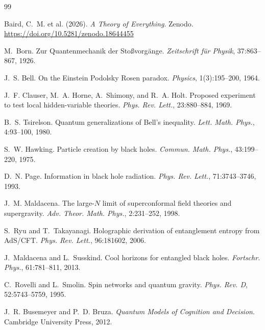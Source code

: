\documentclass[11pt]{article}
\begin{document}
\begin{thebibliography}{99}

Baird, C.~M. et al. (2026).
\newblock \emph{A Theory of Everything}.
\newblock Zenodo. \url{https://doi.org/10.5281/zenodo.18644455}

M.~Born.
\newblock Zur {Q}uantenmechanik der {S}to{\ss}vorg{\"a}nge.
\newblock \emph{Zeitschrift f{\"u}r Physik}, 37:863--867, 1926.

J.~S. Bell.
\newblock On the {E}instein {P}odolsky {R}osen paradox.
\newblock \emph{Physics}, 1(3):195--200, 1964.

J.~F. Clauser, M.~A. Horne, A.~Shimony, and R.~A. Holt.
\newblock Proposed experiment to test local hidden-variable theories.
\newblock \emph{Phys. Rev. Lett.}, 23:880--884, 1969.

B.~S. Tsirelson.
\newblock Quantum generalizations of {B}ell's inequality.
\newblock \emph{Lett. Math. Phys.}, 4:93--100, 1980.

S.~W. Hawking.
\newblock Particle creation by black holes.
\newblock \emph{Commun. Math. Phys.}, 43:199--220, 1975.

D.~N. Page.
\newblock Information in black hole radiation.
\newblock \emph{Phys. Rev. Lett.}, 71:3743--3746, 1993.

J.~M. Maldacena.
\newblock The large-$N$ limit of superconformal field theories and supergravity.
\newblock \emph{Adv. Theor. Math. Phys.}, 2:231--252, 1998.

S.~Ryu and T.~Takayanagi.
\newblock Holographic derivation of entanglement entropy from {A}d{S}/{CFT}.
\newblock \emph{Phys. Rev. Lett.}, 96:181602, 2006.

J.~Maldacena and L.~Susskind.
\newblock Cool horizons for entangled black holes.
\newblock \emph{Fortschr. Phys.}, 61:781--811, 2013.

C.~Rovelli and L.~Smolin.
\newblock Spin networks and quantum gravity.
\newblock \emph{Phys. Rev. D}, 52:5743--5759, 1995.

J.~R. Busemeyer and P.~D. Bruza.
\newblock \emph{Quantum Models of Cognition and Decision}.
\newblock Cambridge University Press, 2012.

\end{thebibliography}
\end{document}
